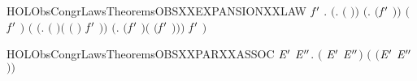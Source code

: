 \newcommand{\HOLObsCongrLawsDate}{19 Novembre 2019}
\newcommand{\HOLObsCongrLawsTime}{10:23}
\begin{SaveVerbatim}{HOLObsCongrLawsTheoremsOBSXXEXPANSIONXXLAW}
\HOLTokenTurnstile{} \HOLSymConst{\HOLTokenForall{}}  \ensuremath{\HOLBoundVar{f}\sp{\prime}} .
       \ensuremath{(}\HOLSymConst{\HOLTokenForall{}}.  \HOLSymConst{\HOLTokenLeq{}}  \HOLSymConst{\HOLTokenImp{}}  \ensuremath{(} \ensuremath{)}\ensuremath{)} \HOLSymConst{\HOLTokenConj{}}
       \ensuremath{(}\HOLSymConst{\HOLTokenForall{}}.  \HOLSymConst{\HOLTokenLeq{}}  \HOLSymConst{\HOLTokenImp{}}  \ensuremath{(}\ensuremath{\HOLBoundVar{f}\sp{\prime}} \ensuremath{)}\ensuremath{)} \HOLSymConst{\HOLTokenImp{}}
        \ensuremath{(}   \HOLSymConst{\ensuremath{\mid}}  \ensuremath{\HOLBoundVar{f}\sp{\prime}} \ensuremath{)}
         \ensuremath{(}
            \ensuremath{(}\HOLTokenLambda{}.  \ensuremath{(} \ensuremath{)}\HOLSymConst{\ensuremath{\ldotp}}\ensuremath{(} \ensuremath{(} \ensuremath{)} \HOLSymConst{\ensuremath{\mid}}  \ensuremath{\HOLBoundVar{f}\sp{\prime}} \ensuremath{)}\ensuremath{)}
             \HOLSymConst{\ensuremath{+}}
            \ensuremath{(}\HOLTokenLambda{}.  \ensuremath{(}\ensuremath{\HOLBoundVar{f}\sp{\prime}} \ensuremath{)}\HOLSymConst{\ensuremath{\ldotp}}\ensuremath{(}   \HOLSymConst{\ensuremath{\mid}}  \ensuremath{(}\ensuremath{\HOLBoundVar{f}\sp{\prime}} \ensuremath{)}\ensuremath{)}\ensuremath{)}
             \HOLSymConst{\ensuremath{+}}    \ensuremath{\HOLBoundVar{f}\sp{\prime}} \ensuremath{)}
\end{SaveVerbatim}
\newcommand{\HOLObsCongrLawsTheoremsOBSXXEXPANSIONXXLAW}{\UseVerbatim{HOLObsCongrLawsTheoremsOBSXXEXPANSIONXXLAW}}
\begin{SaveVerbatim}{HOLObsCongrLawsTheoremsOBSXXPARXXASSOC}
\HOLTokenTurnstile{} \HOLSymConst{\HOLTokenForall{}} \ensuremath{\HOLBoundVar{E}\sp{\prime}} \ensuremath{\HOLBoundVar{E}\sp{\prime\prime}}.  \ensuremath{(} \HOLSymConst{\ensuremath{\mid}} \ensuremath{\HOLBoundVar{E}\sp{\prime}} \HOLSymConst{\ensuremath{\mid}} \ensuremath{\HOLBoundVar{E}\sp{\prime\prime}}\ensuremath{)} \ensuremath{(} \HOLSymConst{\ensuremath{\mid}} \ensuremath{(}\ensuremath{\HOLBoundVar{E}\sp{\prime}} \HOLSymConst{\ensuremath{\mid}} \ensuremath{\HOLBoundVar{E}\sp{\prime\prime}}\ensuremath{)}\ensuremath{)}
\end{SaveVerbatim}
